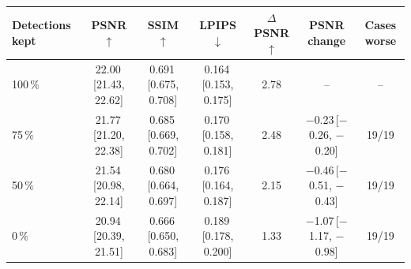\begin{tabular}{lcccccc}
\toprule
Detections kept & PSNR $\uparrow$ & SSIM $\uparrow$ & LPIPS $\downarrow$ & $\Delta$PSNR $\uparrow$ & PSNR change & Cases worse \\
\midrule
100\,\% & 22.00\,{\scriptsize[21.43, 22.62]} & 0.691\,{\scriptsize[0.675, 0.708]} & 0.164\,{\scriptsize[0.153, 0.175]} & 2.78 & -- & -- \\
75\,\% & 21.77\,{\scriptsize[21.20, 22.38]} & 0.685\,{\scriptsize[0.669, 0.702]} & 0.170\,{\scriptsize[0.158, 0.181]} & 2.48 & $-$0.23\,{\scriptsize[$-$0.26, $-$0.20]} & 19/19 \\
50\,\% & 21.54\,{\scriptsize[20.98, 22.14]} & 0.680\,{\scriptsize[0.664, 0.697]} & 0.176\,{\scriptsize[0.164, 0.187]} & 2.15 & $-$0.46\,{\scriptsize[$-$0.51, $-$0.43]} & 19/19 \\
0\,\% & 20.94\,{\scriptsize[20.39, 21.51]} & 0.666\,{\scriptsize[0.650, 0.683]} & 0.189\,{\scriptsize[0.178, 0.200]} & 1.33 & $-$1.07\,{\scriptsize[$-$1.17, $-$0.98]} & 19/19 \\
\bottomrule
\end{tabular}
